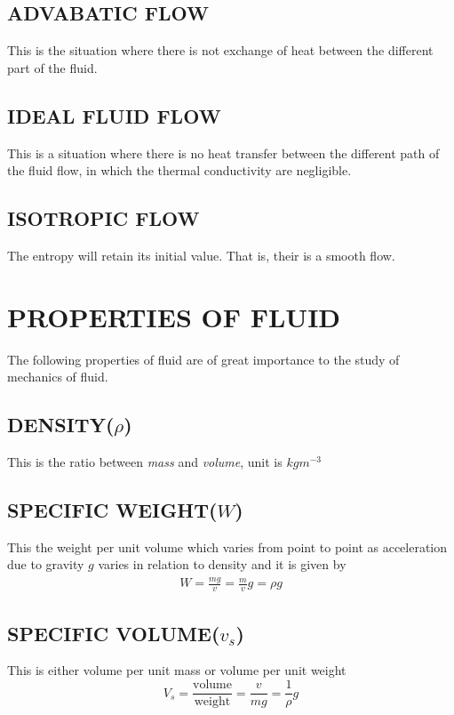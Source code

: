 \documentclass[11pt]{report}
\newcommand{\tti}[1]{\textit{#1}}
\begin{document}
	\subsection{ADVABATIC FLOW}
	This is the situation where there is not exchange of heat between the different part of the fluid.
	
	\subsection{IDEAL FLUID FLOW}
	This is a situation where there is no heat transfer between the different path of the fluid flow, in which the thermal conductivity are negligible.
	
	\subsection{ISOTROPIC FLOW}
	The entropy will retain its initial value. That is, their is a smooth flow. 
	
	\section{PROPERTIES OF FLUID}
	The following properties of fluid are of great importance to the study of mechanics of fluid.
	
	\subsection{DENSITY($\rho$)}
	This is the ratio between \tti{mass} and \tti{volume}, unit is $kgm^{-3}$
	
	\subsection{SPECIFIC WEIGHT($W$)}
	This the weight per unit volume which varies from point to point as acceleration due to gravity $g$ varies in relation to density and it is given by
	\begin{eqnarray*}
		W = \frac{mg}{v} = \frac{m}{v}g = \rho g
	\end{eqnarray*}
	
	\subsection{SPECIFIC VOLUME($v_s$)}
	This is either volume per unit mass or volume per unit weight
	\begin{equation*}
		V_s = \frac{\text{volume}}{\text{weight}} = \frac{v}{mg}=\frac{1}{\rho}g
	\end{equation*}
	
\end{document}
